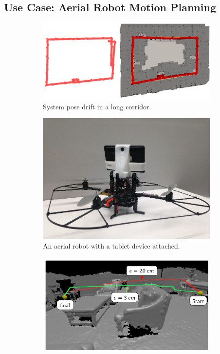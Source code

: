 \documentclass[conference]{IEEEtran}
\begin{document}
 \subsection{Use Case: Aerial Robot Motion Planning}
 \label{section:robot}
  \begin{figure}
  \centering
   	 \begin{subfigure}{0.55\columnwidth}\centering
 	 \includegraphics[width=1\textwidth]{img/corridor_composite.png}
 	 \caption{System pose drift in a long corridor.}
 	 \label{fig:drift}
 	 \end{subfigure}
  \begin{subfigure}{0.43\columnwidth}\centering
	 \includegraphics[width=1.0\textwidth]{img/aerial.jpg}
	 \caption{An aerial robot with a tablet device attached.}
	 \label{fig:robot}
  \end{subfigure}
	\begin{subfigure}{1.0\columnwidth}\centering
	 \includegraphics[width=1\textwidth]{img/path_plan.pdf}

\end{subfigure}
\end{figure}
\end{document}
